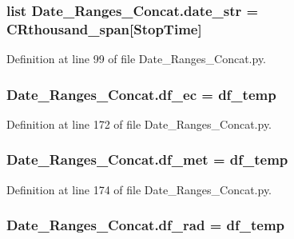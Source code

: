 \subsubsection[{date\+\_\+str}]{\setlength{\rightskip}{0pt plus 5cm}list Date\+\_\+\+Ranges\+\_\+\+Concat.\+date\+\_\+str = {\bf C\+Rthousand\+\_\+span}\mbox{[}\textquotesingle{}Stop\+Time\textquotesingle{}\mbox{]}}\label{namespace_date___ranges___concat_a0ca32bca90b9650a04d4032d34c06410}


Definition at line 99 of file Date\+\_\+\+Ranges\+\_\+\+Concat.\+py.

\hypertarget{namespace_date___ranges___concat_aa81d32149c73a93c7c0cf4d6215e4616}{}
\subsubsection[{df\+\_\+ec}]{\setlength{\rightskip}{0pt plus 5cm}Date\+\_\+\+Ranges\+\_\+\+Concat.\+df\+\_\+ec = {\bf df\+\_\+temp}}\label{namespace_date___ranges___concat_aa81d32149c73a93c7c0cf4d6215e4616}


Definition at line 172 of file Date\+\_\+\+Ranges\+\_\+\+Concat.\+py.

\hypertarget{namespace_date___ranges___concat_a16a14361f76262d8416a6825e111896a}{}
\subsubsection[{df\+\_\+met}]{\setlength{\rightskip}{0pt plus 5cm}Date\+\_\+\+Ranges\+\_\+\+Concat.\+df\+\_\+met = {\bf df\+\_\+temp}}\label{namespace_date___ranges___concat_a16a14361f76262d8416a6825e111896a}


Definition at line 174 of file Date\+\_\+\+Ranges\+\_\+\+Concat.\+py.

\hypertarget{namespace_date___ranges___concat_a4f4bd2ce4ac7c6df40e6d37af0f28ab4}{}
\subsubsection[{df\+\_\+rad}]{\setlength{\rightskip}{0pt plus 5cm}Date\+\_\+\+Ranges\+\_\+\+Concat.\+df\+\_\+rad = {\bf df\+\_\+temp}}\label{namespace_date___ranges___concat_a4f4bd2ce4ac7c6df40e6d37af0f28ab4}


